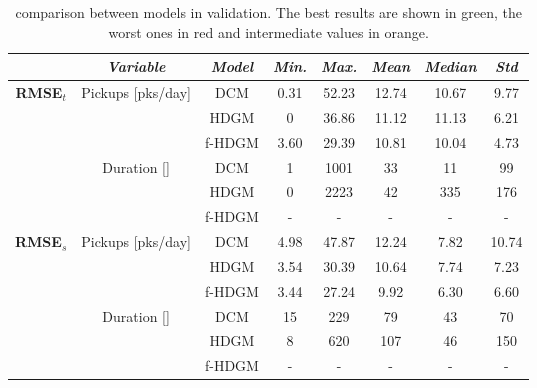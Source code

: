 \begin{table}[h!]
	\centering
	\renewcommand\arraystretch{1.3}
	\begin{tabular}{c|c|c|c|c|c|c|c}
		\hline
		\textit{} & \textit{Variable} & \textit{Model} & \textit{Min.} & \textit{Max.} & \textit{Mean} & \textit{Median} & \textit{Std}\\
		\hline
		\multirow{6}{4em}{\textbf{RMSE$_t$}} & \multirow{3}{4em}{Pickups [pks/day]} & DCM & \cellcolor{orange}\num{0.31} & \cellcolor{red}\num{52.23} & \cellcolor{red}\num{12.74} & \cellcolor{orange}\num{10.67} & \cellcolor{red}\num{9.77} \\ \cline{3-8}
		& & HDGM & \cellcolor{green}\num{0} & \cellcolor{orange}\num{36.86} & \cellcolor{orange}\num{11.12} & \cellcolor{red}\num{11.13} & \cellcolor{orange}\num{6.21} \\ \cline{3-8}
		& & f-HDGM & \cellcolor{red}\num{3.60} & \cellcolor{green}\num{29.39} & \cellcolor{green}\num{10.81} & \cellcolor{green}\num{10.04} & \cellcolor{green}\num{4.73} \\ \cline{2-8}
		& \multirow{3}{4em}{Duration [\si{\min}]} & DCM & \cellcolor{red}\num{1} & \cellcolor{green}\num{1001} & \cellcolor{green}\num{33} & \cellcolor{green}\num{11} & \cellcolor{green}\num{99} \\ \cline{3-8} 
		& & HDGM & \cellcolor{green}\num{0} & \cellcolor{red}\num{2223} & \cellcolor{red}\num{42} & \cellcolor{red}\num{335} & \cellcolor{red}\num{176} \\ \cline{3-8}
		& & f-HDGM & - & - & - & - & - \\
		\hline
		\multirow{6}{4em}{\textbf{RMSE$_s$}} & \multirow{3}{4em}{Pickups [pks/day]} & DCM & \cellcolor{red}\num{4.98} & \cellcolor{red}\num{47.87} & \cellcolor{red}\num{12.24} & \cellcolor{red}\num{7.82} & \cellcolor{red}\num{10.74} \\ \cline{3-8}
		& & HDGM & \cellcolor{orange}\num{3.54} & \cellcolor{orange}\num{30.39} & \cellcolor{orange}\num{10.64} & \cellcolor{orange}\num{7.74} & \cellcolor{orange}\num{7.23} \\ \cline{3-8}
		& & f-HDGM & \cellcolor{green}\num{3.44} & \cellcolor{green}\num{27.24} & \cellcolor{green}\num{9.92} & \cellcolor{green}\num{6.30} & \cellcolor{green}\num{6.60} \\ \cline{2-8}
		& \multirow{3}{4em}{Duration [\si{\min}]} & DCM & \cellcolor{red}\num{15} & \cellcolor{green}\num{229} & \cellcolor{green}\num{79} & \cellcolor{green}\num{43} & \cellcolor{green}\num{70} \\ \cline{3-8} 
		& & HDGM & \cellcolor{green}\num{8} & \cellcolor{red}\num{620} & \cellcolor{red}\num{107} & \cellcolor{red}\num{46} & \cellcolor{red}\num{150} \\ \cline{3-8}
		& & f-HDGM & - & - & - & - & - \\
		\hline
	\end{tabular}
	\caption[Comparison between models in validation]{comparison between models in validation. The best results are shown in green, the worst ones in red and intermediate values in orange.}
	\label{RMSE_final_comp}
\end{table}

